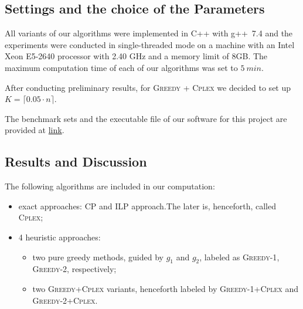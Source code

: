 \documentclass[runningheads,a4paper]{elsarticle}
\begin{document}
     \subsection{Settings and the choice of the Parameters}
      All variants of our algorithms were implemented in C++ with g++~7.4 and the experiments were conducted in single-threaded mode on a machine with an Intel Xeon E5-2640 processor with 2.40 GHz and a memory limit of 8GB. The maximum computation time of each of our algorithms was set to $5\ min$.

      After conducting preliminary results, for
        \textsc{Greedy + \textsc{Cplex}} we decided to set up $K = \lceil 0.05 \cdot n \rceil$.

     The benchmark sets and the executable file of our software for this project are provided at \href{link}{link}.
	\subsection{Results and Discussion}
        The following algorithms are included in our computation:
        \begin{itemize}
        	\item  exact approaches: CP and ILP approach.The later is, henceforth, called \textsc{Cplex};
            \item 4 heuristic approaches:
           \begin{itemize}
           	\item two pure greedy methods, guided by $g_1$ and $g_2$, labeled as \textsc{Greedy-1}, \textsc{Greedy-2}, respectively;
            \item two \textsc{Greedy+Cplex} variants, henceforth labeled by  \textsc{Greedy-1}+\textsc{Cplex} and
            \textsc{Greedy-2}+\textsc{Cplex}.
        \end{itemize}
    \end{itemize}
\end{document}
